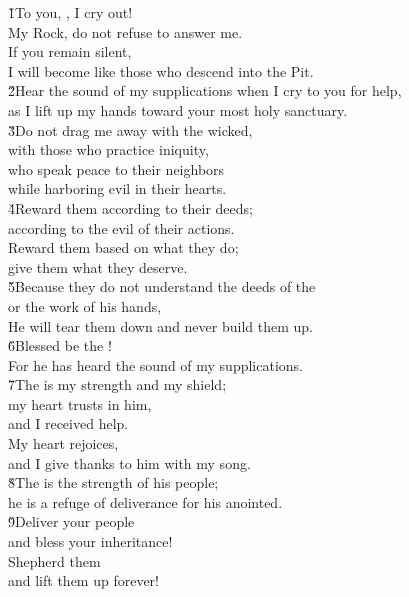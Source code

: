 \begin{poetry}
\poeml \v{1}To you, , I cry out! \\
\poemll    My Rock, do not refuse to answer me. \\
\poeml If you remain silent, \\
\poemll    I will become like those who descend into the Pit. \\
\poeml \v{2}Hear the sound of my supplications when I cry to you for help, \\
\poemll    as I lift up my hands toward your most holy sanctuary. \\
\poeml \v{3}Do not drag me away with the wicked, \\
\poemll    with those who practice iniquity, \\
\poeml who speak peace to their neighbors \\
\poemll    while harboring evil in their hearts. \\
\poeml \v{4}Reward them according to their deeds; \\
\poemll    according to the evil of their actions. \\
\poeml Reward them based on what they do; \\
\poemll    give them what they deserve. \\
\poeml \v{5}Because they do not understand the deeds of the  \\
\poemll    or the work of his hands, \\
\poemlll       He will tear them down and never build them up. \\
\poeml \v{6}Blessed be the ! \\
\poemll    For he has heard the sound of my supplications. \\
\poeml \v{7}The  is my strength and my shield; \\
\poemll    my heart trusts in him, \\
\poemlll       and I received help. \\
\poeml My heart rejoices, \\
\poemll    and I give thanks to him with my song. \\
\poeml \v{8}The  is the strength of his people; \\
\poemll    he is a refuge of deliverance for his anointed. \\
\poeml \v{9}Deliver your people \\
\poemll    and bless your inheritance! \\
\poeml Shepherd them \\
\poemll    and lift them up forever!
\end{poetry}


